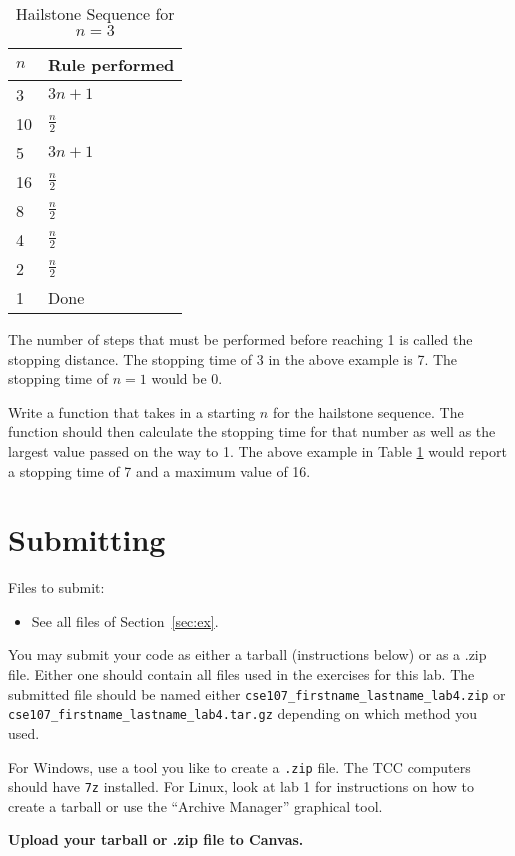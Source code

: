 \documentclass[11pt]{cselabheader}
\begin{document}
\begin{description}
  \begin{table}[!ht]
    \centering
    \begin{tabular}{ll}
      \toprule
      $n$ & Rule performed\\
      \midrule
      3 & $3n + 1$\\
      10 & $\frac{n}{2}$\\
      5 & $3n + 1$\\
      16 & $\frac{n}{2}$\\
      8 & $\frac{n}{2}$\\
      4 & $\frac{n}{2}$\\
      2 & $\frac{n}{2}$\\
      1 & Done\\
      \bottomrule
    \end{tabular}
    \caption{Hailstone Sequence for $n = 3$}
    \label{ex:hailstone}
  \end{table}

  The number of steps that must be performed before
  reaching 1 is called the stopping distance. The stopping
  time of 3 in the above example is 7. The stopping
  time of $n = 1$ would be 0.

  Write a function that takes in a starting $n$ for the
  hailstone sequence. The function should then calculate the
  stopping time for that number as well as the largest value
  passed on the way to 1. The above example in Table \ref{ex:hailstone}
  would report a stopping time of 7 and a maximum value of 16.
\end{description} 

\section{Submitting}

Files to submit:
\begin{itemize}
\item See all files of Section~\ref{sec:ex}.
\end{itemize}

You may submit your code as either a tarball (instructions below) or as a .zip
file. Either one should contain all files used in the exercises for this lab.
The submitted file should be named either
\texttt{cse107\_firstname\_lastname\_lab4.zip} or
\texttt{cse107\_firstname\_lastname\_lab4.tar.gz} depending on which method you
used.

For Windows, use a tool you like to create a \texttt{.zip} file. The TCC
computers should have \texttt{7z} installed. For Linux, look at lab 1 for
instructions on how to create a tarball or use the ``Archive Manager'' graphical
tool.

\begin{center}
  \textbf{Upload your tarball or .zip file to Canvas.}
\end{center}
\end{document}
